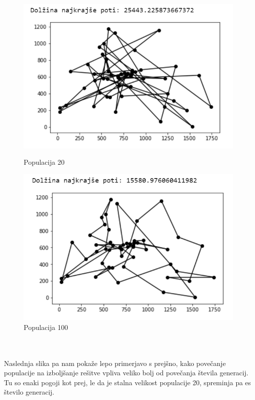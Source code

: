 \documentclass[12pt,a4paper]{amsart}
\theoremstyle{definition} %
\theoremstyle{plain} %
\begin{document}
\begin{figure}[h!]
\begin{minipage}[t]{0.48\textwidth}
\includegraphics[width=\linewidth,keepaspectratio=true]{primer-pop1}
\caption{Populacija 20}
\label{pop1}
\end{minipage}
\hspace*{\fill} %
\begin{minipage}[t]{0.48\textwidth}
\includegraphics[width=\linewidth,keepaspectratio=true]{primer-pop2}
\caption{Populacija 100}
\label{pop2}
\end{minipage}
\end{figure}
\\
\\
Naslednja slika pa nam pokaže lepo primerjavo s prejšno, kako povečanje populacije na izboljšanje rešitve vpliva veliko bolj od povečanja števila generacij. Tu so enaki pogoji kot prej, le da je stalna velikost populacije 20, spreminja pa es število generacij. 
\end{document}
